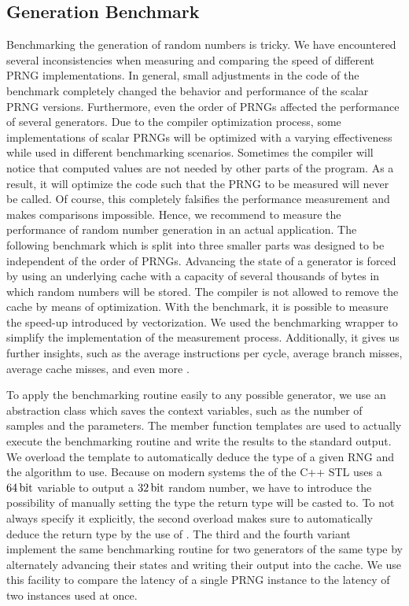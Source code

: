\documentclass{stdlocal}
\begin{document}
  \subsection{Generation Benchmark} %
  \label{sub:generation_benchmark}
    Benchmarking the generation of random numbers is tricky.
    We have encountered several inconsistencies when measuring and comparing the speed of different PRNG implementations.
    In general, small adjustments in the code of the benchmark completely changed the behavior and performance of the scalar PRNG versions.
    Furthermore, even the order of PRNGs affected the performance of several generators.
    Due to the compiler optimization process, some implementations of scalar PRNGs will be optimized with a varying effectiveness while used in different benchmarking scenarios.
    Sometimes the compiler will notice that computed values are not needed by other parts of the program.
    As a result, it will optimize the code such that the PRNG to be measured will never be called.
    Of course, this completely falsifies the performance measurement and makes comparisons impossible.
    Hence, we recommend to measure the performance of random number generation in an actual application.
    The following benchmark which is split into three smaller parts was designed to be independent of the order of PRNGs.
    Advancing the state of a generator is forced by using an underlying cache with a capacity of several thousands of bytes in which random numbers will be stored.
    The compiler is not allowed to remove the cache by means of optimization.
    With the benchmark, it is possible to measure the speed-up introduced by vectorization.
    We used the  benchmarking wrapper to simplify the implementation of the measurement process.
    Additionally, it gives us further insights, such as the average instructions per cycle, average branch misses, average cache misses, and even more \autocite{perfevent}.

    To apply the benchmarking routine easily to any possible generator, we use an abstraction class which saves the context variables, such as the number of samples and the  parameters.
    The member function templates  are used to actually execute the benchmarking routine and write the results to the standard output.
    We overload the template to automatically deduce the type of a given RNG and the algorithm to use.
    Because on modern systems the  of the C++ STL uses a $64\, \mathrm{bit}$ variable to output a $32\, \mathrm{bit}$ random number, we have to introduce the possibility of manually setting the type the return type will be casted to.
    To not always specify it explicitly, the second overload makes sure to automatically deduce the return type by the use of .
    The third and the fourth variant implement the same benchmarking routine for two generators of the same type by alternately advancing their states and writing their output into the cache.
    We use this facility to compare the latency of a single PRNG instance to the latency of two instances used at once.
\end{document}
